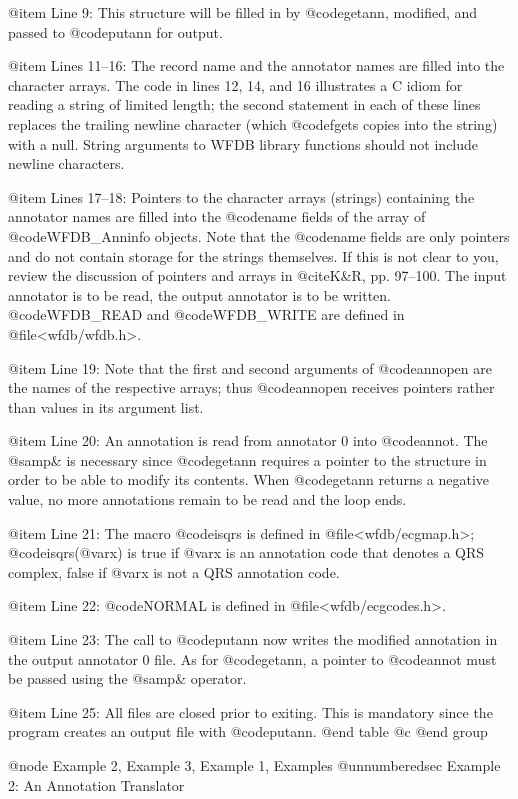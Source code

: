 {{{{{{{{{{@item Line 9:
This structure will be filled in by @code{getann}, modified, and passed
to @code{putann} for output.

@item Lines 11--16:
The record name and the annotator names are filled into the character
arrays.  The code in lines 12, 14, and 16 illustrates a C idiom for
reading a string of limited length; the second statement in each of
these lines replaces the trailing newline character (which @code{fgets}
copies into the string) with a null.  String arguments to WFDB library
functions should not include newline characters.

@item Lines 17--18:
Pointers to the character arrays (strings) containing the annotator
names are filled into the @code{name} fields of the array of
@code{WFDB_Anninfo} objects. Note that the @code{name} fields are only
pointers and do not contain storage for the strings themselves.  If this
is not clear to you, review the discussion of pointers and arrays in
@cite{K&R}, pp.  97--100.  The input annotator is to be read, the output
annotator is to be written.  @code{WFDB_READ} and @code{WFDB_WRITE} are
defined in @file{<wfdb/wfdb.h>}.

@item Line 19:
Note that the first and second arguments of @code{annopen} are
the names of the respective arrays; thus @code{annopen} receives pointers
rather than values in its argument list.

@item Line 20:
An annotation is read from annotator 0 into @code{annot}.
The @samp{&} is necessary since @code{getann} requires a pointer to
the structure in order to be able to modify its contents.  When
@code{getann} returns a negative value, no more annotations remain to be
read and the loop ends.

@item Line 21:
The macro @code{isqrs} is defined in @file{<wfdb/ecgmap.h>};
@code{isqrs(@var{x})} is true if @var{x} is an annotation code that
denotes a QRS complex, false if @var{x} is not a QRS annotation
code.

@item Line 22:
@code{NORMAL} is defined in @file{<wfdb/ecgcodes.h>}.

@item Line 23:
The call to @code{putann} now writes the modified annotation in the
output annotator 0 file.  As for @code{getann}, a pointer to
@code{annot} must be passed using the @samp{&} operator.

@item Line 25:
All files are closed prior to exiting.  This is mandatory since the
program creates an output file with @code{putann}.
@end table
@c @end group

@node     Example 2, Example 3, Example 1, Examples
@unnumberedsec Example 2: An Annotation Translator

}}}}}}}}}}
